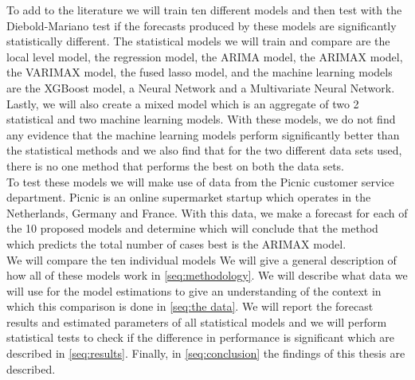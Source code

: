 To add to the literature we will train ten different models and then test with the Diebold-Mariano test if the forecasts produced by these models are significantly statistically different. The statistical models we will train and compare are the local level model, the regression model, the ARIMA model, the ARIMAX model, the VARIMAX model, the fused lasso model, and the machine learning models are the XGBoost model, a Neural Network and a Multivariate Neural Network. Lastly, we will also create a mixed model which is an aggregate of two 2 statistical and two machine learning models. With these models, we do not find any evidence that the machine learning models perform significantly better than the statistical methods and we also find that for the two different data sets used, there is no one method that performs the best on both the data sets.\\

To test these models we will make use of data from the Picnic customer service department. Picnic is an online supermarket startup which operates in the Netherlands, Germany and France.  With this data, we make a forecast for each of the 10 proposed models and determine which will conclude that the method which predicts the total number of cases best is the ARIMAX model.\\

We will compare the ten individual models We will give a general description of how all of these models work in \autoref{seq:methodology}. We will describe what data we will use for the model estimations to give an understanding of the context in which this comparison is done in \autoref{seq:the data}. We will report the forecast results and estimated parameters of all statistical models and we will perform statistical tests to check if the difference in performance is significant which are described in \autoref{seq:results}. Finally, in \autoref{seq:conclusion} the findings of this thesis are described.


